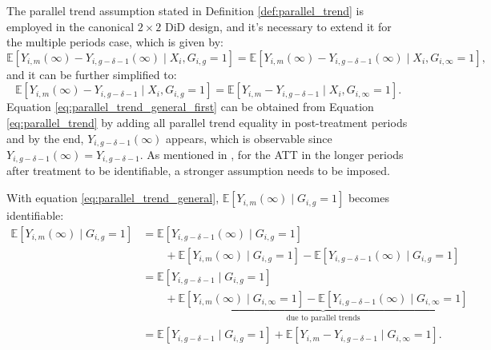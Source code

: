 The parallel trend assumption stated in Definition \ref{def:parallel_trend} is employed in the canonical $2 \times 2$ DiD design, and it's necessary to extend it for the multiple periods case, which is given by:
\begin{equation}\label{eq:parallel_trend_general_first}
\mathbb{E}[Y_{i, m}(\infty) - Y_{i, g-\delta-1}(\infty) \mid X_i, G_{i, g} = 1]
=
\mathbb{E}[Y_{i, m}(\infty) - Y_{i, g-\delta-1}(\infty) \mid X_i, G_{i, \infty} = 1],
\end{equation}
and it can be further simplified to:
\begin{equation}\label{eq:parallel_trend_general}
\mathbb{E}[Y_{i, m}(\infty) - Y_{i, g-\delta-1} \mid X_i, G_{i, g} = 1]
=
\mathbb{E}[Y_{i, m} - Y_{i, g-\delta-1} \mid X_i, G_{i, \infty} = 1].
\end{equation}
Equation \ref{eq:parallel_trend_general_first} can be obtained from Equation \ref{eq:parallel_trend} by adding all parallel trend equality in post-treatment periods and by the end, $Y_{i, g-\delta-1}(\infty)$ appears, which is observable since $Y_{i, g-\delta-1}(\infty) = Y_{i, g-\delta-1}$. As mentioned in \cite{roth2023s}, for the ATT in the longer periods after treatment to be identifiable, a stronger assumption needs to be imposed.

With equation \ref{eq:parallel_trend_general}, $\mathbb{E}[Y_{i, m}(\infty) \mid G_{i, g} = 1]$ becomes identifiable:
\begin{align}
\mathbb{E}[Y_{i, m}(\infty) \mid G_{i, g} = 1]
&=
\mathbb{E}[Y_{i, g-\delta-1}(\infty) \mid G_{i, g} = 1]
\nonumber \\
&\quad\quad
+\mathbb{E}[Y_{i, m}(\infty) \mid G_{i, g} = 1]
    - \mathbb{E}[Y_{i, g-\delta-1}(\infty) \mid G_{i, g} = 1]
\nonumber \\
&=
\mathbb{E}[Y_{i, g-\delta-1} \mid G_{i, g} = 1]
\nonumber \\
&\quad\quad
+
\underbrace{
    \mathbb{E}[Y_{i, m}(\infty) \mid G_{i, \infty} = 1]
    -
    \mathbb{E}[Y_{i, g-\delta-1}(\infty) \mid G_{i, \infty} = 1]
}_{
\text{due to parallel trends}
}
\nonumber \\
&=
\mathbb{E}[Y_{i, g-\delta-1} \mid G_{i, g} = 1]
+
\mathbb{E}[Y_{i, m} - Y_{i, g-\delta-1} \mid G_{i, \infty} = 1].
\end{align}

